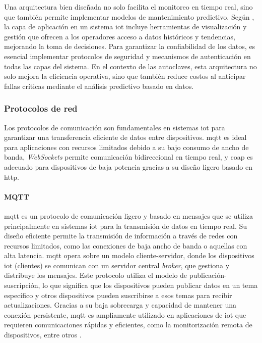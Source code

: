Una arquitectura bien diseñada no solo facilita el monitoreo en tiempo real, sino que también permite implementar modelos de mantenimiento predictivo. Según \cite{AlFuqaha2015}, la capa de aplicación en un sistema \acrshort{iot} incluye herramientas de visualización y gestión que ofrecen a los operadores acceso a datos históricos y tendencias, mejorando la toma de decisiones. Para garantizar la confiabilidad de los datos, es esencial implementar protocolos de seguridad y mecanismos de autenticación en todas las capas del sistema. En el contexto de las autoclaves, esta arquitectura no solo mejora la eficiencia operativa, sino que también reduce costos al anticipar fallas críticas mediante el análisis predictivo basado en datos.

\subsubsection{Protocolos de red}
Los protocolos de comunicación son fundamentales en sistemas \acrshort{iot} para garantizar una transferencia eficiente de datos entre dispositivos. \acrfull{mqtt} es ideal para aplicaciones con recursos limitados debido a su bajo consumo de ancho de banda, \textit{WebSockets} permite comunicación bidireccional en tiempo real, y \acrfull{coap} es adecuado para dispositivos de baja potencia gracias a su diseño ligero basado en \acrfull{http}. 

\paragraph{MQTT}
\acrfull{mqtt} es un protocolo de comunicación ligero y basado en mensajes que se utiliza principalmente en sistemas \acrshort{iot} para la transmisión de datos en tiempo real. Su diseño eficiente permite la transmisión de información a través de redes con recursos limitados, como las conexiones de baja ancho de banda o aquellas con alta latencia. \acrshort{mqtt} opera sobre un modelo cliente-servidor, donde los dispositivos \acrshort{iot} (clientes) se comunican con un servidor central  \textit{broker}, que gestiona y distribuye los mensajes. Este protocolo utiliza el modelo de publicación-suscripción, lo que significa que los dispositivos pueden publicar datos en un tema específico y otros dispositivos pueden suscribirse a esos temas para recibir actualizaciones. Gracias a su baja sobrecarga y capacidad de mantener una conexión persistente, \acrshort{mqtt} es ampliamente utilizado en aplicaciones de \acrshort{iot} que requieren comunicaciones rápidas y eficientes, como la monitorización remota de dispositivos, entre otros \citep{Light2017}.

